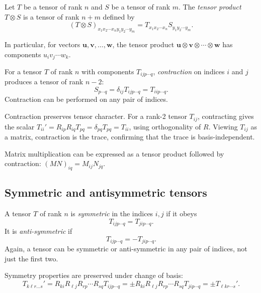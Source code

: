 \documentclass[a4paper]{article}
\begin{document}
\begin{defi}
  Let $T$ be a tensor of rank $n$ and $S$ be a tensor of rank $m$. The \emph{tensor product} $T\otimes S$ is a tensor of rank $n + m$ defined by
  \[
    (T \otimes S)_{x_1 x_2\cdots x_n y_1y_2\cdots y_m} = T_{x_1x_2\cdots x_n}S_{y_1y_2\cdots y_m}.
  \]
\end{defi}

\begin{rmk}
  In particular, for vectors $\mathbf{u}, \mathbf{v}, \ldots, \mathbf{w}$, the tensor product $\mathbf{u}\otimes \mathbf{v}\otimes \cdots \otimes \mathbf{w}$ has components $u_i v_j \cdots w_k$.
\end{rmk}

\begin{defi}
  For a tensor $T$ of rank $n$ with components $T_{ijp\cdots q}$, \emph{contraction} on indices $i$ and $j$ produces a tensor of rank $n - 2$:
  \[
    S_{p\cdots q} = \delta_{ij}T_{ij p\cdots q} = T_{iip\cdots q}.
  \]
  Contraction can be performed on any pair of indices.
\end{defi}

\begin{rmk}
  Contraction preserves tensor character. For a rank-2 tensor $T_{ij}$, contracting gives the scalar $T_{ii}' = R_{ip}R_{iq}T_{pq} = \delta_{pq}T_{pq} = T_{ii}$, using orthogonality of $R$. Viewing $T_{ij}$ as a matrix, contraction is the trace, confirming that the trace is basis-independent.
\end{rmk}

\begin{rmk}
  Matrix multiplication can be expressed as a tensor product followed by contraction: $(MN)_{iq} = M_{ij}N_{jq}$.
\end{rmk}
\subsection{Symmetric and antisymmetric tensors}
\begin{defi}
  A tensor $T$ of rank $n$ is \emph{symmetric} in the indices $i,j$ if it obeys
  \[
    T_{ijp\cdots q} = T_{jip\cdots q}.
  \]
  It is \emph{anti-symmetric} if
  \[
    T_{ijp\cdots q} = -T_{jip\cdots q}.
  \]
  Again, a tensor can be symmetric or anti-symmetric in any pair of indices, not just the first two.
\end{defi}

\begin{rmk}
  Symmetry properties are preserved under change of basis:
  \[
    T_{k\ell r\ldots s}' = R_{ki}R_{\ell j}R_{rp}\cdots R_{sq}T_{ijp\cdots q} = \pm R_{ki} R_{\ell j} R_{rp}\cdots R_{sq}T_{jip\cdots q} = \pm T_{\ell kr\cdots s}'.
  \]
\end{rmk}
\end{document}
